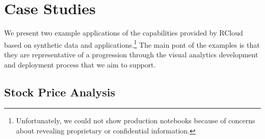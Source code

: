 \section{Case Studies}

We present two example applications of the capabilities provided by RCloud
based on synthetic data and applications.\footnote{Unfortunately, we could
not show production notebooks because of concerns about revealing proprietary
or confidential information.} The main pont of the examples is that they are
representative of a progression through the visual analytics development
and deployment process that we aim to support.

\subsection{Stock Price Analysis\label{sec:stockvis}}

